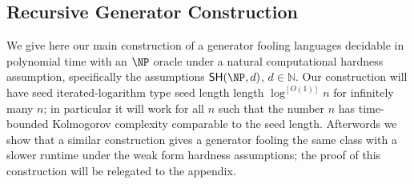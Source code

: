 \documentclass[11pt]{article}
\newtheorem{theorem}{Theorem}
\newcommand{\B}{\{0,1\}}
\newcommand{\od}[1]{O^{\langle #1 \rangle}}
\newcommand{\SH}{\mathsf{SH}}
\newcommand{\todo}[1]{{\color{red} TODO: #1}}
\begin{document}
\subsection{Recursive Generator Construction}
We give here our main construction of a generator fooling languages decidable in polynomial time with an $\NP$ oracle under a natural computational hardness assumption, specifically the assumptions $\SH(\NP,d)$, $d \in \mathbb{N}$. Our construction will have seed iterated-logarithm type seed length length $\log^{[O(1)]}n$ for infinitely many $n$; in particular it will work for all $n$ such that the number $n$ has time-bounded Kolmogorov complexity comparable to the seed length. Afterwords we show that a similar construction gives a generator fooling the same class with a slower runtime under the weak form hardness assumptions; the proof of this construction will be relegated to the appendix.


\end{document}
